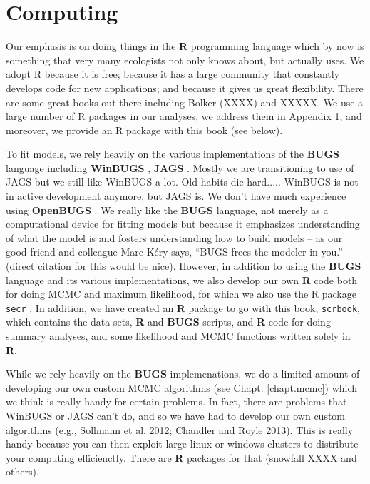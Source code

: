 \section*{Computing}

Our emphasis is on doing things in the {\bf R} programming language
which by now is something that very many ecologists not only knows
about, but actually uses. We adopt R because it is free; because it
has a large community that constantly develops code for new
applications; and because it gives us great flexibility.  There are
some great books out there including Bolker (XXXX) and XXXXX. We use a
large number of R packages in our analyses, we address them in
Appendix 1, and moreover, we provide an R package with this book (see
below).


To fit models, we rely heavily on the various implementations of the
{\bf BUGS} language including {\bf WinBUGS} \citep{lunn_etal:2000},
{\bf JAGS} \citep{plummer:2003}. 
 Mostly we are transitioning to use of JAGS but we
still like WinBUGS a lot. Old habits die hard..... WinBUGS is not in
active development anymore, but JAGS is. We don't have much experience
using {\bf OpenBUGS}
 \citep{thomas_etal:2006}. We really like
the {\bf BUGS} language, not merely  as a computational device for
fitting models but because it emphasizes
understanding of what the model is and fosters understanding how to
build models -- as  our good friend and colleague Marc K\'{e}ry says,
``BUGS frees the modeler in you.''  (direct
citation for this would be nice).  However, in addition to using the
{\bf BUGS} language and its various implementations, we also develop our own
{\bf R} code both for doing MCMC
and maximum likelihood, for which we also use the R
package \mbox{\tt secr} \citep{efford:2011}. In addition, we have
created an {\bf R} package to go with this book, \mbox{\tt scrbook},
which contains the data sets, {\bf R} and {\bf BUGS} scripts, and {\bf
  R} code for doing summary analyses, and some likelihood and MCMC
functions written solely in {\bf R}.

While we rely heavily on the {\bf BUGS} implemenations, we do a limited amount of developing our own custom MCMC algorithms
(see Chapt. \ref{chapt.mcmc}) which we think is really handy for certain
problems. In fact, there are problems that WinBUGS or JAGS can't do,
and so we have had to develop our own custom algorithms (e.g.,
Sollmann et al. 2012; Chandler and Royle 2013). 
This is really handy because you can then exploit large linux or
windows clusters to distribute your computing efficienctly. There are
{\bf R} packages for that (snowfall XXXX and others).

